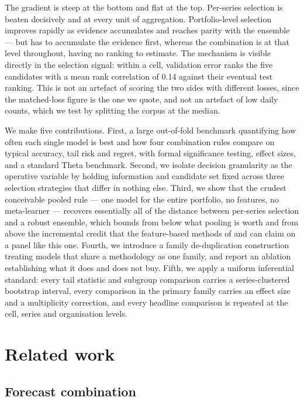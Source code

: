 \documentclass[11pt]{article}
\begin{document}
The gradient is steep at the bottom and flat at the top. Per-series selection is beaten decisively and at every unit of aggregation. Portfolio-level selection improves rapidly as evidence accumulates and reaches parity with the ensemble --- but has to accumulate the evidence first, whereas the combination is at that level throughout, having no ranking to estimate. The mechanism is visible directly in the selection signal: within a cell, validation error ranks the five candidates with a mean rank correlation of 0.14 against their eventual test ranking. This is not an artefact of scoring the two sides with different losses, since the matched-loss figure is the one we quote, and not an artefact of low daily counts, which we test by splitting the corpus at the median.

We make five contributions. First, a large out-of-fold benchmark quantifying how often each single model is best and how four combination rules compare on typical accuracy, tail risk and regret, with formal significance testing, effect sizes, and a standard Theta benchmark. Second, we isolate decision granularity as the operative variable by holding information and candidate set fixed across three selection strategies that differ in nothing else. Third, we show that the crudest conceivable pooled rule --- one model for the entire portfolio, no features, no meta-learner --- recovers essentially all of the distance between per-series selection and a robust ensemble, which bounds from below what pooling is worth and from above the incremental credit that the feature-based methods of \citet{montero2020} and \citet{talagala2023} can claim on a panel like this one. Fourth, we introduce a family de-duplication construction treating models that share a methodology as one family, and report an ablation establishing what it does and does not buy. Fifth, we apply a uniform inferential standard: every tail statistic and subgroup comparison carries a series-clustered bootstrap interval, every comparison in the primary family carries an effect size and a multiplicity correction, and every headline comparison is repeated at the cell, series and organisation levels.

\section{Related work}

\subsection{Forecast combination}
\end{document}
